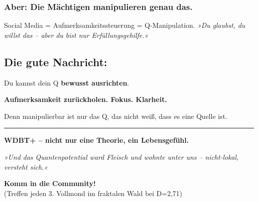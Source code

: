 \documentclass[10pt,a5paper]{article}
\begin{document}
\subsubsection*{Aber: Die Mächtigen manipulieren genau das.}
Social Media = Aufmerksamkeitssteuerung = Q-Manipulation. 
\textit{»Du glaubst, du willst das – aber du bist nur Erfüllungsgehilfe.«}

\subsection*{Die gute Nachricht:}
Du kannst dein Q \textbf{bewusst ausrichten}. 
\begin{center}
    \large\textbf{Aufmerksamkeit zurückholen. Fokus. Klarheit.}
\end{center}
Denn manipulierbar ist nur das Q, das nicht weiß, dass es eine Quelle ist.

\vspace{0.3cm}
\hrule
\vspace{0.3cm}

\begin{center}
    {\Large\bfseries WDBT+ – nicht nur eine Theorie, ein Lebensgefühl.}
    
    \vspace{0.2cm}
    \small
    \textit{»Und das Quantenpotential ward Fleisch und wohnte unter uns – nicht-lokal, versteht sich.«}
    
    \vspace{0.3cm}
    \textbf{Komm in die Community!} \\
    (Treffen jeden 3. Vollmond im fraktalen Wald bei D=2,71)
\end{center}
\end{document}
